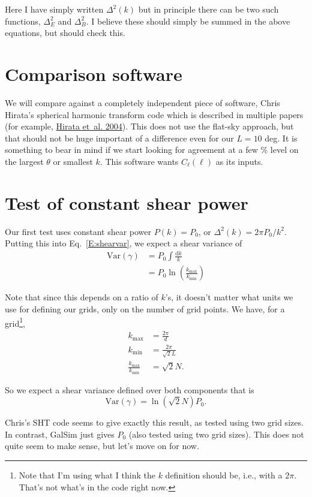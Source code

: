 \documentclass[preprint]{aastex}
\newcommand{\kmax}{\ensuremath{k_\mathrm{max}}}
\newcommand{\kmin}{\ensuremath{k_\mathrm{min}}}
\newcommand{\rmd}{\ensuremath{\mathrm{d}}}
\newcommand{\beq}{\begin{equation}}
\newcommand{\eeq}{\end{equation}}
\begin{document}
Here I have simply written $\Delta^2(k)$ but in principle there can be
two such functions, $\Delta^2_{E}$ and $\Delta^2_B$.  I believe these
should simply be summed in the above equations, but should check this.

\section{Comparison software}

We will compare against a completely independent piece of software,
Chris Hirata's spherical harmonic transform code which is described in
multiple papers (for example,
\href{http://adsabs.harvard.edu/abs/2004PhRvD..70j3501H}{Hirata
  et~al. 2004}).  This does not use the flat-sky
approach, but that should not be huge important of a difference even
for our $L=10$ deg.  It is something to bear in mind if we start
looking for agreement at a few \% level on the largest $\theta$ or
smallest $k$.  This software wants $C_\ell(\ell)$ as its inputs.

\section{Test of constant shear power}

Our first test uses constant shear power $P(k)=P_0$, or
$\Delta^2(k)=2\pi P_0/k^2$.  Putting this into Eq.~\ref{E:shearvar},
we expect a shear variance of
\begin{align}
\mathrm{Var}(\gamma) &= P_0 \int \frac{\rmd k}{k} \\
 &= P_0 \ln{\left(\frac{\kmax}{\kmin}\right)}
\end{align}

Note that since this depends on a ratio of $k$'s, it doesn't matter
what units we use for defining our grids, only on the number of grid
points.  We have, for a grid\footnote{Note that I'm using what I think
  the $k$ definition should be, i.e., with a $2\pi$.  That's not
  what's in the code right now.},
\begin{align}
\kmax &= \frac{2\pi}{d} \\
\kmin &= \frac{2\pi}{\sqrt{2}L}\\
\frac{\kmax}{\kmin} &= \sqrt{2}N.
\end{align}

So we expect a shear variance defined over both components that is
\beq
\mathrm{Var}(\gamma) = \ln{(\sqrt{2}N)} P_0.
\eeq

Chris's SHT code seems to give exactly this result, as tested using
two grid sizes.  In contrast, GalSim just gives $P_0$ (also tested
using two grid sizes).  This does not quite seem to make sense, but
let's move on for now.
\end{document}
